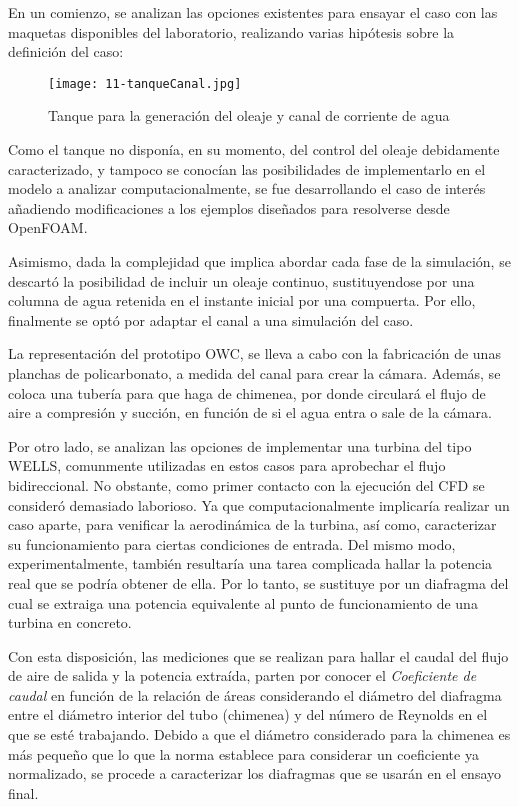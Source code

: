 En un comienzo, se analizan las opciones existentes para ensayar el caso
con las maquetas disponibles del laboratorio, realizando varias
hipótesis sobre la definición del caso:

\begin{figure}
\centering
\texttt{[image: 11-tanqueCanal.jpg]}
\caption{Tanque para la generación del oleaje y canal de corriente de agua}
\label{fig:tanqueCanal}
\end{figure}

Como el tanque no disponía, en su momento, del control del oleaje
debidamente caracterizado, y tampoco se conocían las posibilidades de
implementarlo en el modelo a analizar computacionalmente, se fue
desarrollando el caso de interés añadiendo modificaciones a los ejemplos
diseñados para resolverse desde OpenFOAM.

Asimismo, dada la complejidad que implica abordar cada fase de la
simulación, se descartó la posibilidad de incluir un oleaje continuo,
sustituyendose por una columna de agua retenida en el instante inicial
por una compuerta. Por ello, finalmente se optó por adaptar el canal a
una simulación del caso.

La representación del prototipo OWC, se lleva a cabo con la fabricación
de unas planchas de policarbonato, a medida del canal para crear la
cámara. Además, se coloca una tubería para que haga de chimenea, por
donde circulará el flujo de aire a compresión y succión, en función de
si el agua entra o sale de la cámara.

Por otro lado, se analizan las opciones de implementar una turbina del
tipo WELLS, comunmente utilizadas en estos casos para aprobechar el
flujo bidireccional. No obstante, como primer contacto con la ejecución
del CFD se consideró demasiado laborioso. Ya que computacionalmente
implicaría realizar un caso aparte, para venificar la aerodinámica de la
turbina, así como, caracterizar su funcionamiento para ciertas
condiciones de entrada. Del mismo modo, experimentalmente, también
resultaría una tarea complicada hallar la potencia real que se podría
obtener de ella. Por lo tanto, se sustituye por un diafragma del cual se
extraiga una potencia equivalente al punto de funcionamiento de una
turbina en concreto.

Con esta disposición, las mediciones que se realizan para hallar el
caudal del flujo de aire de salida y la potencia extraída, parten por
conocer el \emph{Coeficiente de caudal} en función de la relación de
áreas considerando el diámetro del diafragma entre el diámetro interior
del tubo (chimenea) y del número de Reynolds en el que se esté
trabajando. Debido a que el diámetro considerado para la chimenea es más
pequeño que lo que la norma establece para considerar un coeficiente ya
normalizado, se procede a caracterizar los diafragmas que se usarán en
el ensayo final.

